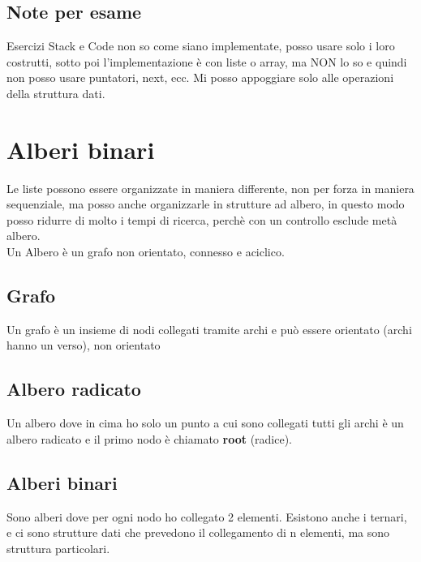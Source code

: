\subsection{Note per esame}
Esercizi Stack e Code non so come siano implementate, posso usare solo i loro costrutti, sotto
poi l'implementazione è con liste o array, ma NON lo so e quindi non posso usare puntatori, next, ecc.
Mi posso appoggiare solo alle operazioni della struttura dati.
\section{Alberi binari}
Le liste possono essere organizzate in maniera differente, non per forza in maniera sequenziale,
ma posso anche organizzarle in strutture ad albero, in questo modo posso ridurre di molto
i tempi di ricerca, perchè con un controllo esclude metà albero.\\
Un Albero è un grafo non orientato, connesso e aciclico.
\subsection{Grafo}
Un grafo è un insieme di nodi collegati tramite archi e può essere orientato (archi hanno un verso),
non orientato
\subsection{Albero radicato}
Un albero dove in cima ho solo un punto a cui sono collegati tutti gli archi è un
albero radicato e il primo nodo è chiamato \textbf{root} (radice).\\
\subsection{Alberi binari}
Sono alberi dove per ogni nodo ho collegato 2 elementi. Esistono anche i ternari, e ci sono strutture
dati che prevedono il collegamento di n elementi, ma sono struttura particolari.

